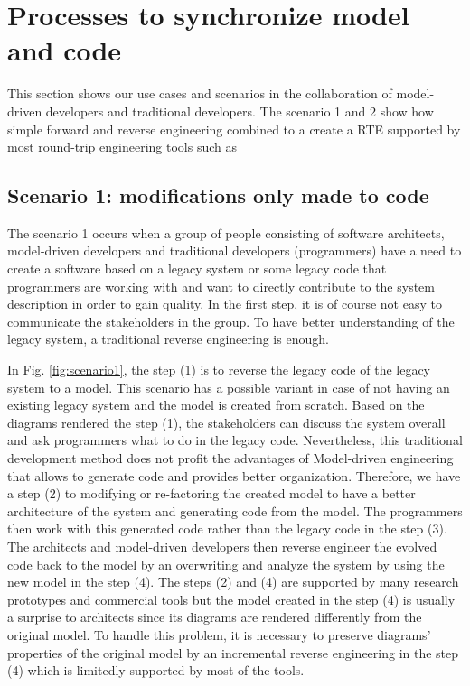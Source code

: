 \section{Processes to synchronize model and code}
\label{sec:processes}

This section shows our use cases and scenarios in the collaboration of model-driven developers and traditional developers. The scenario 1 and 2 show how simple forward and reverse engineering combined to a create a RTE supported by most round-trip engineering tools such as 

\subsection{Scenario 1: modifications only made to code}
\label{scenario1}

The scenario 1 occurs when a group of people consisting of software architects, model-driven developers and traditional developers (programmers) have a need to create a software based on a legacy system or some legacy code that programmers are working with and want to directly contribute to the system description in order to gain quality. In the first step, it is of course not easy to communicate the stakeholders in the group. To have better understanding of the legacy system, a traditional reverse engineering is enough. 

In Fig. \ref{fig:scenario1}, the step (1) is to reverse the legacy code of the legacy system to a model. This scenario has a possible variant in case of not having an existing legacy system and the model is created from scratch. Based on the diagrams rendered the step (1), the stakeholders can discuss the system overall and ask programmers what to do in the legacy code. Nevertheless, this traditional development method does not profit the advantages of Model-driven engineering that allows to generate code and provides better organization. Therefore, we have a step (2) to modifying or re-factoring the created model to have a better architecture of the system and generating code from the model. The programmers then work with this generated code rather than the legacy code in the step (3). The architects and model-driven developers then reverse engineer the evolved code back to the model by an overwriting and analyze the system by using the new model in the step (4). The steps (2) and (4) are supported by many research prototypes and commercial tools \cite{UModel, visual, Rhapsody, Magicdraw, EA} but the model created in the step (4) is usually a surprise to architects since its diagrams are rendered differently from the original model. To handle this problem, it is necessary to preserve diagrams' properties of the original model by an incremental reverse engineering in the step (4) which is limitedly supported by most of the tools. 

